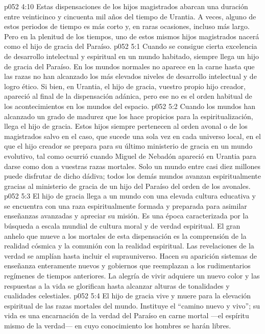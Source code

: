\vs p052 4:10 \pc Estas dispensaciones de los hijos magistrados abarcan una duración entre veinticinco y cincuenta mil años del tiempo de Urantia. A veces, alguno de estos periodos de tiempo es más corto y, en raras ocasiones, incluso más largo. Pero en la plenitud de los tiempos, uno de estos mismos hijos magistrados nacerá como el hijo de gracia del Paraíso.
\vs p052 5:1 Cuando se consigue cierta excelencia de desarrollo intelectual y espiritual en un mundo habitado, siempre llega un hijo de gracia del Paraíso. En los mundos normales no aparece en la carne hasta que las razas no han alcanzado los más elevados niveles de desarrollo intelectual y de logro ético. Si bien, en Urantia, el hijo de gracia, vuestro propio hijo creador, apareció al final de la dispensación adánica, pero ese no es el orden habitual de los acontecimientos en los mundos del espacio.
\vs p052 5:2 Cuando los mundos han alcanzado un grado de madurez que los hace propicios para la espiritualización, llega el hijo de gracia. Estos hijos siempre pertenecen al orden avonal o de los magistrados salvo en el caso, que sucede una sola vez en cada universo local, en el que el hijo creador se prepara para su último ministerio de gracia en un mundo evolutivo, tal como ocurrió cuando Miguel de Nebadón apareció en Urantia para darse como don a vuestras razas mortales. Solo un mundo entre casi diez millones puede disfrutar de dicho dádiva; todos los demás mundos avanzan espiritualmente gracias al ministerio de gracia de un hijo del Paraíso del orden de los avonales.
\vs p052 5:3 \pc El hijo de gracia llega a un mundo con una elevada cultura educativa y se encuentra con una raza espiritualmente formada y preparada para asimilar enseñanzas avanzadas y apreciar su misión. Es una época caracterizada por la búsqueda a escala mundial de cultura moral y de verdad espiritual. El gran anhelo que mueve a los mortales de esta dispensación es la comprensión de la realidad cósmica y la comunión con la realidad espiritual. Las revelaciones de la verdad se amplían hasta incluir el suprauniverso. Hacen su aparición sistemas de enseñanza enteramente nuevos y gobiernos que reemplazan a los rudimentarios regímenes de tiempos anteriores. La alegría de vivir adquiere un nuevo color y las respuestas a la vida se glorifican hasta alcanzar alturas de tonalidades y cualidades celestiales.
\vs p052 5:4 El hijo de gracia vive y muere para la elevación espiritual de las razas mortales del mundo. Instituye el “camino nuevo y vivo”; su vida es una encarnación de la verdad del Paraíso en carne mortal ---el espíritu mismo de la verdad--- en cuyo conocimiento los hombres se harán libres.
